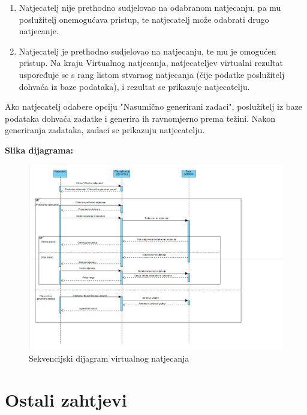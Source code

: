 					\begin{enumerate}
					\item Natjecatelj nije prethodno sudjelovao na odabranom natjecanju, pa mu poslužitelj onemogućava pristup, te natjecatelj može odabrati drugo natjecanje.
					\item Natjecatelj je prethodno sudjelovao na natjecanju, te mu je omogućen pristup. Na kraju Virtualnog natjecanja, natjecateljev virtualni rezultat uspoređuje se s rang listom stvarnog natjecanja (čije podatke poslužitelj dohvaća iz baze podataka), i rezultat se prikazuje natjecatelju.
					\end{enumerate}
					
					Ako natjecatelj odabere opciju "Nasumično generirani zadaci", poslužitelj iz baze podataka dohvaća zadatke i generira ih ravnomjerno prema težini. Nakon generiranja zadataka, zadaci se prikazuju natjecatelju.
					
					\textbf{Slika dijagrama:}
					\begin{figure}[H]
					\centering
					\includegraphics[scale=0.4]{slike/Virtualno natjecanje}
					\caption{Sekvencijski dijagram virtualnog natjecanja}
					\end{figure}
			
					
				
				
	
		\section{Ostali zahtjevi}
		
